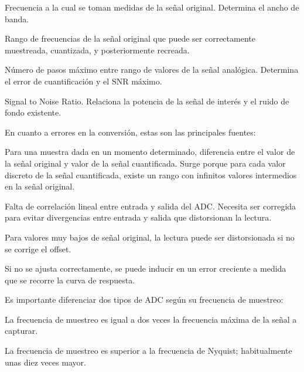 \documentclass[12pt]{report} %
\begin{document}
	\begin{description}[font=\bfseries, style=multiline, align=left, before={\renewcommand\makelabel[1]{\bfseries ##1:}}]
		\item[Frecuencia de muestreo] Frecuencia a la cual se toman medidas de la señal original. Determina el ancho de banda.
		\item[Ancho de banda] Rango de frecuencias de la señal original que puede ser correctamente muestreada, cuantizada, y posteriormente recreada.
		\item[Resolución] Número de pasos máximo entre rango de valores de la señal analógica. Determina el error de cuantificación y el SNR máximo.
		\item[SNR] Signal to Noise Ratio. Relaciona la potencia de la señal de interés y el ruido de fondo existente.
	\end{description}

	En cuanto a errores en la conversión, estas son las principales fuentes:
	
	\begin{description}[font=\bfseries, style=multiline, align=left, before={\renewcommand\makelabel[1]{\bfseries ##1:}}]
		\item[Cuantificación] Para una muestra dada en un momento determinado, diferencia entre el valor de la señal original y valor de la señal cuantificada. Surge porque para cada valor discreto de la señal cuantificada, existe un rango con infinitos valores intermedios en la señal original.
		\item[Linealidad] Falta de correlación lineal entre entrada y salida del ADC. Necesita ser corregida para evitar divergencias entre entrada y salida que distorsionan la lectura.
		\item[Offset] Para valores muy bajos de señal original, la lectura puede ser distorsionada si no se corrige el offset.
		\item[Ganancia] Si no se ajusta correctamente, se puede inducir en un error creciente a medida que se recorre la curva de respuesta.
	\end{description}

	Es importante diferenciar dos tipos de ADC según su frecuencia de muestreo:
	\begin{description}[font=\bfseries, style=multiline, align=left, before={\renewcommand\makelabel[1]{\bfseries ##1:}}]
		\item[A frecuencia de Nyquist] La frecuencia de muestreo es igual a dos veces la frecuencia máxima de la señal a capturar\cite{nyquist}\cite{shannon-nyquist}.
		\item[Sobremuestreados] La frecuencia de muestreo es superior a la frecuencia de Nyquist; habitualmente unas diez veces mayor.
	\end{description}
	
\end{document}
